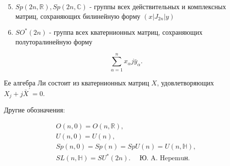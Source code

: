 \documentclass[10pt]{article}
\begin{document}
\begin{enumerate}

  \setcounter{enumi}{4}

  \item $S p(2 n, \mathbb{R}), S p(2 n, \mathbb{C})$ - группы всех действительных и комплексных матриц, сохраняющих билинейную форму $\left(x\left|J_{2 n}\right| y\right)$



  \item $S O^{*}(2 n)$ - группа всех кватернионных матриц, сохраняющих полуторалинейную форму



\end{enumerate}



\[

\sum_{\alpha=1}^{n} x_{\alpha} j \bar{y}_{\alpha} .

\]



Ее алгебра Ли состоит из кватернионных матриц $X$, удовлетворяющих $X_{j}+j \bar{X}^{\prime}=0$.



Другие обозначения:



\[

\begin{gathered}

O(n, 0)=O(n, \mathbb{R}), \\

U(n, 0)=U(n), \\

S p(n, 0)=S p(n)=S p U(n)=U(n, \mathbb{H}), \\

S L(n, \mathbb{H})=S U^{*}(2 n) . \quad \text { Ю. A. Hepemuн. }

\end{gathered}

\]
\end{document}
